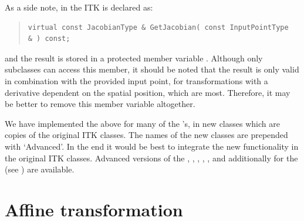 \documentclass{InsightArticle}
\begin{document}
As a side note, in the ITK  is declared as:
\begin{quote}
\begin{verbatim}
virtual const JacobianType & GetJacobian( const InputPointType  & ) const;
\end{verbatim}
\end{quote}
and the result is stored in a protected member variable
. Although only subclasses can access this member,
it should be noted that the result is only valid in combination with
the provided input point, for transformations with a derivative
dependent on the spatial position, which are most. Therefore, it may
be better to remove this member variable altogether.

We have implemented the above for many of the 's,
in new classes which are copies of the original ITK classes. The
names of the new classes are prepended with `Advanced'. In the end
it would be best to integrate the new functionality in the original
ITK classes. Advanced versions of the ,
, ,
,
, and additionally for the
 (see \cite{Klein06}) are available.


\section{Affine transformation}\label{sec:affine}
\end{document}
